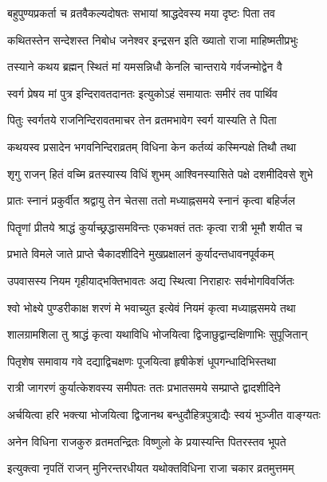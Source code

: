 \twolineshloka
{बहुपुण्यप्रकर्ता च व्रतवैकल्यदोषतः}
{सभायां श्राद्धदेवस्य मया दृष्टः पिता तव} %

\twolineshloka
{कथितस्तेन सन्देशस्त निबोध जनेश्वर}
{इन्द्रसन इति ख्यातो राजा माहिष्मतीप्रभुः} %

\twolineshloka
{तस्याने कथय ब्रह्मन् स्थितं मां यमसन्निधौ}
{केनलि चान्तराये गर्वजन्मोद्वेन वै} %

\twolineshloka
{स्वर्ग प्रेषय मां पुत्र इन्दिरावतदानतः}
{इत्युकोऽहं समायातः समीरं तव पार्थिव} %

\twolineshloka
{पितुः स्वर्गतये राजनिन्दिरावतमाचर}
{तेन व्रतमभावेग स्वर्ग यास्यति ते पिता} %


\twolineshloka
{कथयस्व प्रसादेन भगवनिन्दिराव्रतम्}
{विधिना केन कर्तव्यं कस्मिन्पक्षे तिथौ तथा} %


\twolineshloka
{शृगु राजन् हितं वच्मि व्रतस्यास्य विधिं शुभम्}
{आश्विनस्यासिते पक्षे दशमीदिवसे शुभे} %

\twolineshloka
{प्रातः स्नानं प्रकुर्वीत श्रद्वायु तेन चेतसा}
{ततो मध्याह्नसमये स्नानं कृत्वा बहिर्जल} %

\twolineshloka
{पितॄणां प्रीतये श्राद्धं कुर्याच्छ्रद्धासमविन्तः}
{एकभक्तं ततः कृत्वा रात्री भूमौ शयीत च} %

\twolineshloka
{प्रभाते विमले जाते प्राप्ते चैकादशीदिने}
{मुखप्रक्षालनं कुर्यादन्तधावनपूर्वकम्} %

\twolineshloka
{उपवासस्य नियम गृहीयाद्भक्तिभावतः}
{अद्य स्थित्वा निराहारः सर्वभोगविवर्जितः} %

\twolineshloka
{श्वो भोक्ष्ये पुण्डरीकाक्ष शरणं मे भवाच्युत}
{इत्येवं नियमं कृत्वा मध्याह्नसमये तथा} %

\twolineshloka
{शालग्रामशिला तु श्राद्धं कृत्वा यथाविधि}
{भोजयित्वा द्विजाछुद्वान्दक्षिणाभिः सुपूजितान्} %

\twolineshloka
{पितृशेष समावाय गवे दद्याद्विचक्षणः}
{पूजयित्वा हृषीकेशं धूपगन्धादिभिस्तथा} %

\twolineshloka
{रात्री जागरणं कुर्यात्केशवस्य समीपतः}
{ततः प्रभातसमये सम्प्राप्ते द्वादशीदिने} %

\twolineshloka
{अर्चयित्वा हरि भक्त्या भोजयित्वा द्विजानथ}
{बन्धुदौहित्रपुत्राद्यैः स्वयं भुञ्जीत वाङ्ग्यतः} %

\twolineshloka
{अनेन विधिना राजकुरु व्रतमतन्द्रितः}
{विष्णुलो के प्रयास्यन्ति पितरस्तव भूपते} %

\twolineshloka
{इत्युक्त्वा नृपतिं राजन् मुनिरन्तरधीयत}
{यथोक्तविधिना राजा चकार व्रतमुत्तमम्} %

